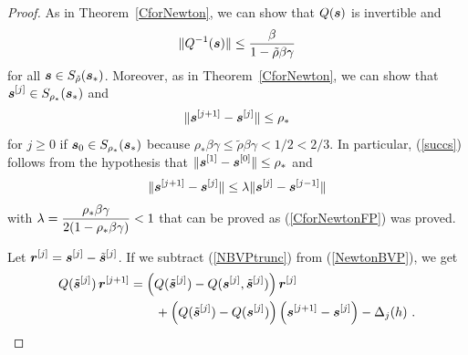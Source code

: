 \begin{proof}
As in Theorem~\ref{CforNewton}, we can show that $Q(\bm{s})$ is
invertible and
\[
\| Q^{-1}(\bm{s}) \| \leq
\frac{\beta}{1-\tilde{\rho}\beta\gamma}
\]
for all $\bm{s} \in S_{\tilde{\rho}}(\bm{s}_\ast)$.  Moreover, as in
Theorem~\ref{CforNewton}, we can show that
$\displaystyle \bm{s}^{[j]} \in S_{\rho_\ast}(\bm{s}_\ast)$ and
\begin{equation}\label{succs}
\| \bm{s}^{[j+1]} - \bm{s}^{[j]} \| \leq \rho_\ast
\end{equation}
for $j\geq 0$ if $\bm{s}_0 \in S_{\rho_\ast}(\bm{s}_\ast)$
because $\rho_\ast \beta \gamma \leq \tilde{\rho} \beta \gamma < 1/2 < 2/3$.
In particular, (\ref{succs}) follows from the hypothesis that
$\displaystyle \| \bm{s}^{[1]} - \bm{s}^{[0]} \| \leq \rho_\ast$ and
\[
\| \bm{s}^{[j+1]} - \bm{s}^{[j]}\| \leq \lambda \|
\bm{s}^{[j]} - \bm{s}^{[j-1]} \|
\]
with $\displaystyle \lambda =
\frac{\rho_\ast \beta \gamma}{2(1-\rho_\ast \beta\gamma)} < 1$
that can be proved as (\ref{CforNewtonFP}) was proved.

Let $\displaystyle \bm{r}^{[j]} = \bm{s}^{[j]} - \tilde{\bm{s}}^{[j]}$.
If we subtract 
(\ref{NBVPtrunc}) from (\ref{NewtonBVP}), we get
\begin{equation} \label{smx}
\begin{split}
Q(\tilde{\bm{s}}^{[j]})\,\bm{r}^{[j+1]} &= \left( Q(\tilde{\bm{s}}^{[j]}) -
Q(\bm{s}^{[j]},\tilde{\bm{s}}^{[j]}) \right) \bm{r}^{[j]} \\
&\qquad + \left( Q(\tilde{\bm{s}}^{[j]}) -Q(\bm{s}^{[j]}) \right)
\left( \bm{s}^{[j+1]} - \bm{s}^{[j]} \right) - \Delta_j(h) \ .
\end{split}
\end{equation}


\end{proof}
